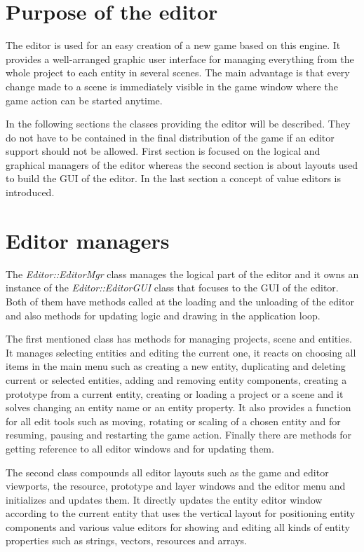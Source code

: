 \documentclass[a4paper, 12pt]{report}
\begin{document}
\section{Purpose of the editor}

The editor is used for an easy creation of a new game based on this engine. It provides a well-arranged graphic user interface for managing everything from the whole project to each entity in several scenes. The main advantage is that every change made to a scene is immediately visible in the game window where the game action can be started anytime.

In the following sections the classes providing the editor will be described. They do not have to be contained in the final distribution of the game if an editor support should not be allowed. First section is focused on the logical and graphical managers of the editor whereas the second section is about layouts used to build the GUI of the editor. In the last section a concept of value editors is introduced.

\section{Editor managers}

The \emph{Editor::EditorMgr} class manages the logical part of the editor and it owns an instance of the \emph{Editor::EditorGUI} class that focuses to the GUI of the editor. Both of them have methods called at the loading and the unloading of the editor and also methods for updating logic and drawing in the application loop.

The first mentioned class has methods for managing projects, scene and entities. It manages selecting entities and editing the current one, it reacts on choosing all items in the main menu such as creating a new entity, duplicating and deleting current or selected entities, adding and removing entity components, creating a prototype from a current entity, creating or loading a project or a scene and it solves changing an entity name or an entity property. It also provides a function for all edit tools such as moving, rotating or scaling of a chosen entity and for resuming, pausing and restarting the game action. Finally there are methods for getting reference to all editor windows and for updating them.

The second class compounds all editor layouts such as the game and editor viewports, the resource, prototype and layer windows and the editor menu and initializes and updates them. It directly updates the entity editor window according to the current entity that uses the vertical layout for positioning entity components and various value editors for showing and editing all kinds of entity properties such as strings, vectors, resources and arrays.
\end{document}
